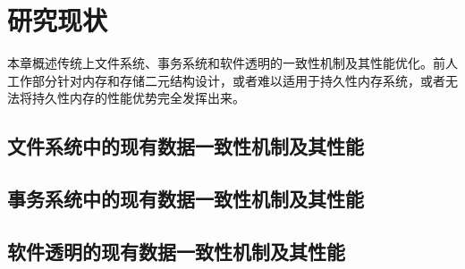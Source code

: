 \chapter{研究现状}
\label{chap:related}

本章概述传统上文件系统、事务系统和软件透明的一致性机制及其性能优化。前人工作部分针对内存和存储二元结构设计，或者难以适用于持久性内存系统，或者无法将持久性内存的性能优势完全发挥出来。

\section{文件系统中的现有数据一致性机制及其性能}

\section{事务系统中的现有数据一致性机制及其性能}

\section{软件透明的现有数据一致性机制及其性能}

